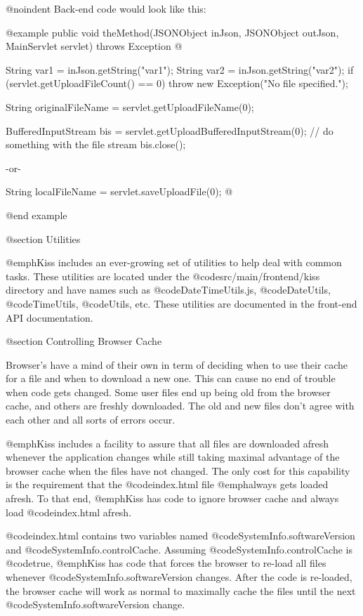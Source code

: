 @noindent
Back-end code would look like this:

@example
public void theMethod(JSONObject inJson, JSONObject outJson, MainServlet servlet) throws Exception @{
    String var1 = inJson.getString("var1");
    String var2 = inJson.getString("var2");
    if (servlet.getUploadFileCount() == 0)
        throw new Exception("No file specified.");
        
    String originalFileName = servlet.getUploadFileName(0);
    
    
    BufferedInputStream bis = servlet.getUploadBufferedInputStream(0);
    // do something with the file stream
    bis.close();
    
         -or-
         
    String localFileName = servlet.saveUploadFile(0);
@}
@end example




@section Utilities

@emph{Kiss} includes an ever-growing set of utilities to help deal with common tasks.
These utilities are located under the @code{src/main/frontend/kiss} directory and have names such as
@code{DateTimeUtils.js}, @code{DateUtils}, @code{TimeUtils}, @code{Utils}, etc.  These utilities
are documented in the front-end API documentation.

@section Controlling Browser Cache

Browser's have a mind of their own in term of deciding when to use
their cache for a file and when to download a new one.  This can cause
no end of trouble when code gets changed.  Some user files end up
being old from the browser cache, and others are freshly downloaded.
The old and new files don't agree with each other and all sorts of
errors occur.

@emph{Kiss} includes a facility to assure that all files are
downloaded afresh whenever the application changes while still taking
maximal advantage of the browser cache when the files have not
changed.  The only cost for this capability is the requirement
that the @code{index.html} file @emph{always} gets loaded afresh.
To that end, @emph{Kiss} has code to ignore browser cache and always load
@code{index.html} afresh.

@code{index.html} contains two variables named @code{SystemInfo.softwareVersion} and @code{SystemInfo.controlCache}.
Assuming @code{SystemInfo.controlCache} is @code{true}, @emph{Kiss} has code that forces the browser
to re-load all files whenever @code{SystemInfo.softwareVersion} changes.  After the code is re-loaded,
the browser cache will work as normal to maximally cache the files until the next
@code{SystemInfo.softwareVersion} change.

